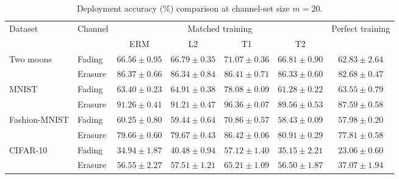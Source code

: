 \begin{table}[htb]
\centering
\caption{Deployment accuracy (\%) comparison at channel-set size $m=20$.}
\label{tab:performance}
\begin{tabular*}{\linewidth}{@{\extracolsep{\fill}}llccccc@{}}
\toprule
\multirow{2}{*}{Dataset} & \multirow{2}{*}{Channel}
& \multicolumn{4}{c}{Matched training} & \multirow{2}{*}{Perfect training} \\
\cmidrule(lr){3-6}
& & ERM & L2 & T1 & T2 &  \\
\midrule
\multirow{2}{*}{Two moons}
& Fading
& $66.56\pm0.95$ & $66.79\pm0.35$ & $\mathbf{71.07}\pm0.36$ & $66.81\pm0.90$ & $62.83\pm2.64$ \\
& Erasure
& $86.37\pm0.66$ & $86.34\pm0.84$ & $\mathbf{86.41}\pm0.71$ & $86.33\pm0.60$ & $82.68\pm0.47$ \\
\midrule
\multirow{2}{*}{MNIST}
& Fading
& $63.40\pm0.23$ & $64.91\pm0.38$ & $\mathbf{78.08}\pm0.09$ & $61.28\pm0.22$ & $63.55\pm0.79$ \\
& Erasure
& $91.26\pm0.41$ & $91.21\pm0.47$ & $\mathbf{96.36}\pm0.07$ & $89.56\pm0.53$ & $87.59\pm0.58$ \\
\midrule
\multirow{2}{*}{Fashion-MNIST}
& Fading
& $60.25\pm0.80$ & $59.44\pm0.64$ & $\mathbf{70.86}\pm0.57$ & $58.43\pm0.09$ & $57.98\pm0.20$ \\
& Erasure
& $79.66\pm0.60$ & $79.67\pm0.43$ & $\mathbf{86.42}\pm0.06$ & $80.91\pm0.29$ & $77.81\pm0.58$ \\
\midrule
\multirow{2}{*}{CIFAR-10}
& Fading
& $34.94\pm1.87$ & $40.48\pm0.94$ & $\mathbf{57.12}\pm1.40$ & $35.15\pm2.21$ & $23.06\pm0.60$ \\
& Erasure
& $56.55\pm2.27$ & $57.51\pm1.21$ & $\mathbf{65.21}\pm1.09$ & $56.50\pm1.87$ & $37.07\pm1.94$ \\
\bottomrule
\end{tabular*}
\end{table}
